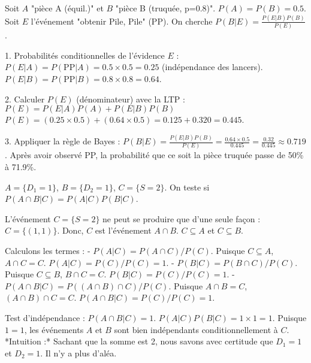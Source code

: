 \begin{correctionbox}
Soit $A$ "pièce A (équil.)" et $B$ "pièce B (truquée, p=0.8)". $P(A)=P(B)=0.5$.
Soit $E$ l'événement "obtenir Pile, Pile" (PP).
On cherche $P(B|E) = \frac{P(E|B)P(B)}{P(E)}$.

1.  Probabilités conditionnelles de l'évidence $E$ :
    $P(E|A) = P(\text{PP} | A) = 0.5 \times 0.5 = 0.25$ (indépendance des lancers).
    $P(E|B) = P(\text{PP} | B) = 0.8 \times 0.8 = 0.64$.

2.  Calculer $P(E)$ (dénominateur) avec la LTP :
    $P(E) = P(E|A)P(A) + P(E|B)P(B)$
    $P(E) = (0.25 \times 0.5) + (0.64 \times 0.5) = 0.125 + 0.320 = 0.445$.

3.  Appliquer la règle de Bayes :
    $P(B|E) = \frac{P(E|B)P(B)}{P(E)} = \frac{0.64 \times 0.5}{0.445} = \frac{0.32}{0.445} \approx 0.719$.
    Après avoir observé PP, la probabilité que ce soit la pièce truquée passe de 50\% à 71.9\%.
\end{correctionbox}

\begin{correctionbox}
$A = \{D_1=1\}$, $B = \{D_2=1\}$, $C = \{S=2\}$.
On teste si $P(A \cap B | C) = P(A|C) P(B|C)$.

L'événement $C = \{S=2\}$ ne peut se produire que d'une seule façon : $C = \{(1,1)\}$.
Donc, $C$ est l'événement $A \cap B$. $C \subseteq A$ et $C \subseteq B$.

Calculons les termes :
- $P(A|C) = P(A \cap C) / P(C)$. Puisque $C \subseteq A$, $A \cap C = C$.
  $P(A|C) = P(C) / P(C) = 1$.
- $P(B|C) = P(B \cap C) / P(C)$. Puisque $C \subseteq B$, $B \cap C = C$.
  $P(B|C) = P(C) / P(C) = 1$.
- $P(A \cap B | C) = P((A \cap B) \cap C) / P(C)$. Puisque $A \cap B = C$, $(A \cap B) \cap C = C$.
  $P(A \cap B | C) = P(C) / P(C) = 1$.

Test d'indépendance :
$P(A \cap B | C) = 1$.
$P(A|C) P(B|C) = 1 \times 1 = 1$.
Puisque $1=1$, les événements $A$ et $B$ sont bien indépendants conditionnellement à $C$.
*Intuition :* Sachant que la somme est 2, nous savons avec certitude que $D_1=1$ et $D_2=1$. Il n'y a plus d'aléa.
\end{correctionbox}

